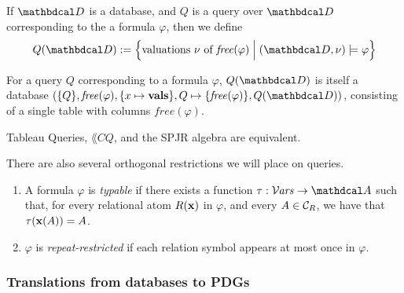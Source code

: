 \documentclass[the-pdg-manual.tex]{subfiles}
\begin{document}
\begin{defn}
	If $\D$ is a database, and $Q$ is a query over $\D$ corresponding to the a formula $\varphi$, then we define
	\[ Q(\D) := \Big\{ \text{valuations $\nu$ of $\mathit{free}(\varphi)$} \Bmid (\D,\nu) \models \varphi \Big\} \]
\end{defn}

\begin{remark}
	For a query $Q$ corresponding to a formula $\varphi$, $Q(\D)$ is itself a database $(\{Q\}, \mathit{free}(\varphi), \{x \mapsto \mathbf{vals}\}, Q\mapsto \{\mathit{free}(\varphi)\}, Q(\D))$, consisting of a single table with columns $\mathit{free}(\varphi)$.	
\end{remark}


\begin{fact}
    Tableau Queries, $\lang{CQ}$, and the SPJR algebra are equivalent.
\end{fact}
% 

There are also several orthogonal restrictions we will place on queries. 
\begin{enumerate}
\item A formula $\varphi$ is \emph{typable} if there exists a function $\tau: \Varis \to \Attrs$ such that, for every relational atom $R(\mathbf x)$ in $\varphi$, and every $A \in \mathcal C_R$, we have that $\tau(\mathbf x(A)) = A$.

\item $\varphi$ is \emph{repeat-restricted} if each relation symbol appears at most once in $\varphi$. 
\end{enumerate}


\subsubsection{Translations from databases to PDGs}

\end{document}
